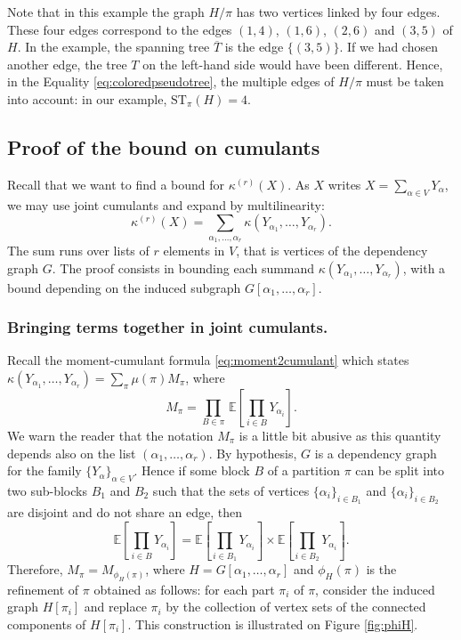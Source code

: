 \documentclass[12pt,a4paper,reqno]{amsart}
\theoremstyle{remark}
\newcommand{\ST}{\mathrm{ST}}
\newcommand{\esper}{\mathbb{E}}
\begin{document}
Note that in this example the graph $H/\pi$ has two vertices linked by four edges. These four edges correspond to the edges $(1,4)$, $(1,6)$, $(2,6)$ and $(3,5)$ of $H$. In the example, the spanning tree $\overline{T}$ is the edge $\{(3,5)\}$. If we had chosen another edge, the tree $T$ on the left-hand side would have been different. Hence, in the Equality \eqref{eq:coloredpseudotree}, the multiple edges of $H/\pi$ must be taken into account: in our example, $\ST_\pi(H)=4$.\bigskip



\subsection{Proof of the bound on cumulants}
Recall that we want to find a bound for $\kappa^{(r)}(X)$. As $X$ writes $X=\sum_{\alpha \in V} Y_{\alpha}$, we may use joint cumulants and expand by multilinearity:
\begin{equation}\label{eq:expcumulant}
    \kappa^{(r)}(X) =
\sum_{\alpha_1,\dots,\alpha_r}
\kappa(Y_{\alpha_1},\dots,Y_{\alpha_r}).
\end{equation}
The sum runs over lists of $r$ elements in $V$, that is vertices of the dependency graph $G$. The proof consists in bounding each summand $\kappa(Y_{\alpha_1},\dots,Y_{\alpha_r})$, with a bound depending on the induced subgraph $G[\alpha_1,\dots,\alpha_r]$.

\subsubsection{Bringing terms together in joint cumulants.}
Recall the moment-cumulant formula \eqref{eq:moment2cumulant} which states $\kappa(Y_{\alpha_1},\dots,Y_{\alpha_r}) = \sum_\pi \mu(\pi) M_\pi$, where 
$$M_\pi = \prod_{B \in \pi} \,\esper\! \left[ \prod_{i \in B} Y_{\alpha_i} \right]. $$
We warn the reader that the notation $M_\pi$ is a little bit abusive as this quantity depends also on the list $(\alpha_1,\dots,\alpha_r)$. By hypothesis, $G$ is a dependency graph for the family $\{Y_{\alpha}\}_{\alpha \in V}$. Hence if some block $B$ of a partition $\pi$ can be split into two sub-blocks $B_1$ and $B_2$ such that the sets of vertices $\{\alpha_i\}_{i \in B_1}$ and $\{\alpha_i\}_{i \in B_2}$ are disjoint and do not share an edge, then
\begin{equation}\esper\! \left[ \prod_{i \in B} Y_{\alpha_i} \right] = 
\esper\! \left[ \prod_{i \in B_1} Y_{\alpha_i} \right] \times
\esper\! \left[ \prod_{i \in B_2} Y_{\alpha_i} \right]. \label{eq:alsoinnoncommutative}\end{equation}
Therefore, $M_\pi=M_{\phi_H(\pi)}$, where $H=G[\alpha_1,\dots,\alpha_r]$ and $\phi_H(\pi)$ is the refinement of $\pi$ obtained as follows: for each part $\pi_i$ of $\pi$, consider the induced graph $H[\pi_i]$ and replace $\pi_i$ by the collection of vertex sets of the connected components of $H[\pi_i]$. This construction is illustrated on Figure \ref{fig:phiH}.
\end{document}
